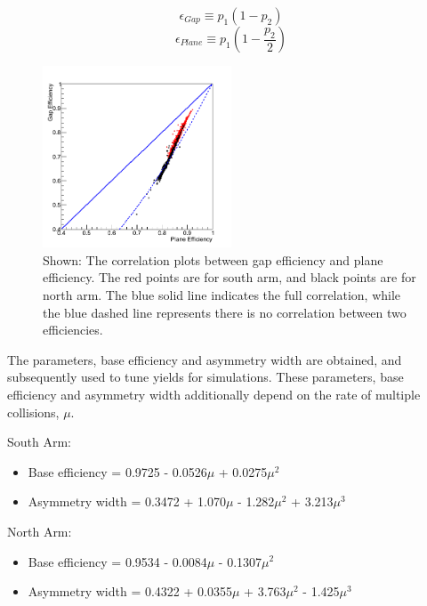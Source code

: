 \begin{equation}[b]
\epsilon_{Gap}\equiv p_{1}(1-p_{2})
\end{equation}
\begin{equation}
\epsilon_{Plane}\equiv p_{1}(1-\frac{p_{2}}{2})
\end{equation}

\begin{figure}
  \centering
  \includegraphics[width=0.5\textwidth]{./figures/mutr_hiteff_run13_scat.png}
  \caption{
    Shown: The correlation plots between gap efficiency and plane efficiency.
    The red points are for south arm, and black points are for north arm. The
    blue solid line indicates the full correlation, while the blue dashed line
    represents there is no correlation between two efficiencies.
  }
  \label{Fig:efficiency:MuTrEff:scat}
\end{figure}

The parameters, base efficiency and asymmetry width are obtained, and
subsequently used to tune yields for simulations. These parameters, base
efficiency and asymmetry width additionally depend on the rate of multiple
collisions, $\mu$.

{\noindent}South Arm:
\begin{itemize}
  \item Base efficiency = 0.9725 - 0.0526$\mu$ + 0.0275$\mu^{2}$
  \item Asymmetry width = 0.3472 + 1.070$\mu$ - 1.282$\mu^{2}$ + 3.213$\mu^{3}$
\end{itemize}

{\noindent}North Arm:
\begin{itemize}
  \item Base efficiency = 0.9534 - 0.0084$\mu$ - 0.1307$\mu^{2}$
  \item Asymmetry width = 0.4322 + 0.0355$\mu$ + 3.763$\mu^{2}$ - 1.425$\mu^{3}$
\end{itemize}


